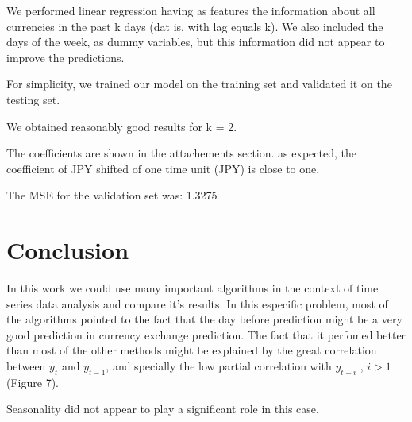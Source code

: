 We performed linear regression having as features the information about all currencies in the past k 
days (dat is, with lag equals k).
We also included the days of the week, as dummy variables, but this information
did not appear to improve the predictions.

For simplicity, we trained our model on the training set and validated it on the testing set. 

We obtained reasonably good results for k = 2.

The coefficients are shown in the attachements section. as expected, the coefficient of JPY shifted of one time
unit (JPY) is close to one.

The MSE for the validation set was: 1.3275 %


\section{Conclusion}

In this work we could use many important algorithms in the context of time series data 
analysis and compare it's results. In this especific problem, most of the algorithms pointed to the fact that the day before prediction might be a very good prediction in currency exchange prediction. The fact that it perfomed better than most of the other methods might be explained by the great correlation between $y_t$ and $y_{t-1}$, and specially the low partial correlation with $y_{t-i}$ , $i>1$ (Figure 7).

Seasonality did not appear to play a significant role in this case.

\newpage

